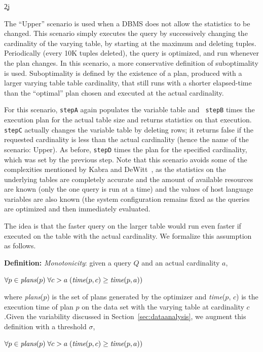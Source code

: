 \c2j{}{The ``Upper'' scenario is used when a DBMS does not allow the statistics to
be changed. This scenario simply executes the query by successively changing
the cardinality of the varying table, by starting at the maximum and
deleting tuples. Periodically (every 10K tuples deleted), the query is
optimized, and run whenever the plan changes. In this scenario, a more
conservative definition of suboptimality is used. Suboptimality is defined
by the existence of a plan, produced with a larger varying table table
cardinality, that still runs with a shorter elapsed-time than the
``optimal'' plan chosen and executed at the actual cardinality.

For this scenario, {\tt stepA} again populates the variable table and {\tt
  stepB} times the execution plan for the actual table size and returns
statistics on that execution. {\tt stepC} actually changes the variable
table by deleting rows; it returns false if the requested cardinality is
less than the actual cardinality (hence the name of the scenario: Upper).
As before, {\tt stepD} times the plan
for the specified cardinality, which was set by the previous step.
Note that this scenario avoids some of the complexities mentioned
by Kabra and DeWitt~\cite{kabra98}, as the statistics on the underlying tables are
completely accurate and the amount of available resources are known (only
the one query is run at a time) and the values of host language variables
are also known (the system configuration remains fixed as the queries are
optimized and then immediately evaluated.


The idea is that the faster query on the larger table would run even faster
if executed on the table with the actual cardinality. We formalize this
assumption as follows.

\noindent
{\bf Definition:} {\em Monotonicity}: given a query $Q$ and an actual
cardinality $a$,

\quad\quad\quad$\forall p \in \hbox{\em plans} (p) \;\forall c > a \;( \hbox{\em time} (p,
c) \geq \hbox{\em time} (p,a) )$

\noindent
where {\em plans}($p$) is the set of plans generated by the optimizer and
{\em time}($p$, $c$) is the execution time of plan $p$ on the data set with
the varying table at cardinality $c$.Given the variability discussed in
Section~\ref{sec:dataanalysis}, we augment this definition with a threshold
$\sigma$,

\quad\quad\quad$\forall p \in \hbox{\em plans} (p) \;\forall c > a \;( \hbox{\em time} (p,
c) \geq \hbox{\em time} (p,a) )$

}
